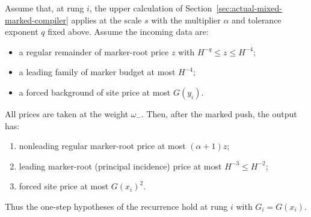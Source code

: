 \begin{lemma}
\label{lem:allarity-step-outputs}
Assume that, at rung $i$, the upper calculation of
Section~\ref{sec:actual-mixed-marked-compiler} applies at the scale $s$
with the multiplier $\alpha$ and tolerance exponent $q$ fixed above.
Assume the incoming data are:
\begin{itemize}
\item a regular remainder of marker-root price $z$ with
 $H^{-q}\le z\le H^{-4}$;
\item a leading family of marker budget at most $H^{-4}$;
\item a forced background of site price at most $G(y_i)$.
\end{itemize}
All prices are taken at the weight $\omega_-$. Then, after the marked
push, the output has:
\begin{enumerate}
\item nonleading regular marker-root price at most $(\alpha+1)z$;
\item leading marker-root (principal incidence) price at most $H^{-3}\le H^{-2}$;
\item forced site price at most $G(x_i)^2$.
\end{enumerate}
Thus the one-step hypotheses of the recurrence hold at rung $i$ with
$G_i=G(x_i)$.
\end{lemma}
